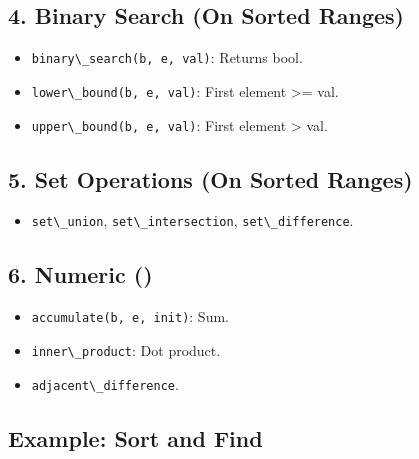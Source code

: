 \hypertarget{binary-search-on-sorted-ranges}{%
\subsection{4. Binary Search (On Sorted
Ranges)}\label{binary-search-on-sorted-ranges}}

\begin{itemize}
\tightlist
\item
  \passthrough{\lstinline!binary\_search(b, e, val)!}: Returns bool.
\item
  \passthrough{\lstinline!lower\_bound(b, e, val)!}: First element
  \textgreater= val.
\item
  \passthrough{\lstinline!upper\_bound(b, e, val)!}: First element
  \textgreater{} val.
\end{itemize}

\hypertarget{set-operations-on-sorted-ranges}{%
\subsection{5. Set Operations (On Sorted
Ranges)}\label{set-operations-on-sorted-ranges}}

\begin{itemize}
\tightlist
\item
  \passthrough{\lstinline!set\_union!},
  \passthrough{\lstinline!set\_intersection!},
  \passthrough{\lstinline!set\_difference!}.
\end{itemize}

\hypertarget{numeric}{%
\subsection{6. Numeric ()}\label{numeric}}

\begin{itemize}
\tightlist
\item
  \passthrough{\lstinline!accumulate(b, e, init)!}: Sum.
\item
  \passthrough{\lstinline!inner\_product!}: Dot product.
\item
  \passthrough{\lstinline!adjacent\_difference!}.
\end{itemize}

\hypertarget{example-sort-and-find}{%
\subsection{Example: Sort and Find}\label{example-sort-and-find}}

